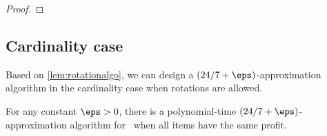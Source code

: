 \begin{proof}
\end{proof}








\subsection{Cardinality case}
\label{sec:tdkrc}
Based on \cref{lem:rotationalgo}, we can design a $(24/7+\eps)$-approximation algorithm in the cardinality case when rotations are allowed.

\begin{theorem}
    \label{thm:r3dkce}
   For any constant $\eps>0$, there is a polynomial-time $(24/7 +\eps)$-approximation algorithm for \tdkr~when all items have the same profit.  
\end{theorem}

